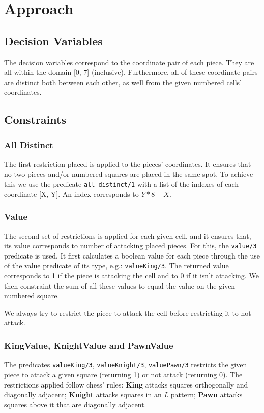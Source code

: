 \documentclass[runningheads]{llncs}
\newcommand{\inlinecode}[1]{\texttt{#1}}
\begin{document}
\section{Approach}
\subsection{Decision Variables}

The decision variables correspond to the coordinate pair of each piece. They are all
within the domain [0, 7] (inclusive). Furthermore, all of these coordinate pairs are
distinct both between each other, as well from the given numbered cells' coordinates.

\subsection{Constraints}
\subsubsection{All Distinct}
The first restriction placed is applied to the pieces' coordinates. It ensures that
no two pieces and/or numbered squares are placed in the same spot. To achieve
this we use the predicate \inlinecode{all\_distinct/1} with a list of the indexes of
each coordinate [X, Y]. An index corresponds to $Y * 8 + X$.

\subsubsection{Value}
The second set of restrictions is applied for each given cell, and it ensures that, its
value corresponds to number of attacking placed pieces. For this, the \inlinecode{value/3}
predicate is used. It first calculates a boolean value for each piece through the use of
the value predicate of its type, e.g.: \inlinecode{valueKing/3}. The returned value
corresponds to 1 if the piece is attacking the cell and to 0 if it isn't attacking.
We then constraint the sum of all these values to equal the value on the given
numbered square.

We always try to restrict the piece to attack the cell before restricting it to not attack.

\subsubsection{KingValue, KnightValue and PawnValue}
The predicates \inlinecode{valueKing/3}, \inlinecode{valueKnight/3}, \inlinecode{valuePawn/3}
restricts the given piece to attack a given square (returning 1) or not attack
(returning 0). The restrictions applied follow chess' rules: \textbf{King}
attacks squares orthogonally and diagonally adjacent; \textbf{Knight} attacks squares
in an \textit{L} pattern; \textbf{Pawn} attacks squares above it that are diagonally
adjacent.
\end{document}
